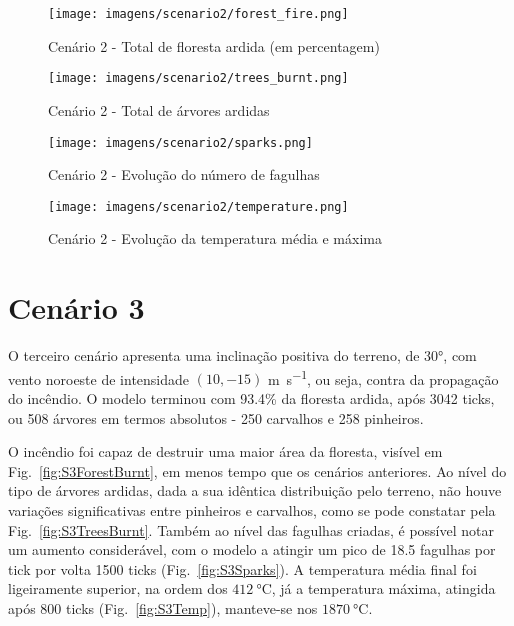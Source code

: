 \begin{figure}[H]
    \centering
    \texttt{[image: imagens/scenario2/forest\_fire.png]}
    \caption{Cenário 2 - Total de floresta ardida (em percentagem)}
    \label{fig:S2ForestBurnt}
\end{figure}

\begin{figure}[H]
    \centering
    \texttt{[image: imagens/scenario2/trees\_burnt.png]}
    \caption{Cenário 2 - Total de árvores ardidas}
    \label{fig:S2TreesBurnt}
\end{figure}

\begin{figure}[H]
    \centering
    \texttt{[image: imagens/scenario2/sparks.png]}
    \caption{Cenário 2 - Evolução do número de fagulhas}
    \label{fig:S2Sparks}
\end{figure}

\begin{figure}[H]
    \centering
    \texttt{[image: imagens/scenario2/temperature.png]}
    \caption{Cenário 2 - Evolução da temperatura média e máxima}
    \label{fig:S2Temp}
\end{figure}

\section{Cenário 3}\label{sec:scenario3}

O terceiro cenário apresenta uma inclinação positiva do terreno, de \ang{30}, com vento noroeste de intensidade $(10, -15)$ \si{\meter\per\second}, ou seja, contra da propagação do incêndio. O modelo terminou com 93.4\% da floresta ardida, após 3042 ticks, ou 508 árvores em termos absolutos - 250 carvalhos e 258 pinheiros. 

O incêndio foi capaz de destruir uma maior área da floresta, visível em Fig.~\ref{fig:S3ForestBurnt}, em menos tempo que os cenários anteriores. Ao nível do tipo de árvores ardidas, dada a sua idêntica distribuição pelo terreno, não houve variações significativas entre pinheiros e carvalhos, como se pode constatar pela Fig.~\ref{fig:S3TreesBurnt}. Também ao nível das fagulhas criadas, é possível notar um aumento considerável, com o modelo a atingir um pico de 18.5 fagulhas por tick por volta 
1500 ticks (Fig.~\ref{fig:S3Sparks}). A temperatura média final foi ligeiramente superior, na ordem dos $\SI{412}{\degreeCelsius}$, já a temperatura máxima, atingida após 800 ticks (Fig.~\ref{fig:S3Temp}), manteve-se nos $\SI{1870}{\degreeCelsius}$.

